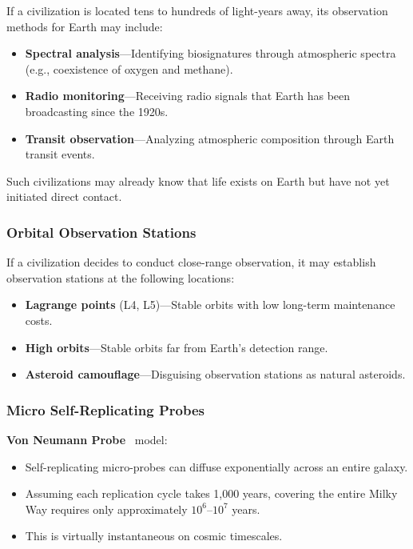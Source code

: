 \documentclass[aps,prd,twocolumn,superscriptaddress,nofootinbib]{revtex4-2}
\begin{document}
If a civilization is located tens to hundreds of light-years away, its observation methods for Earth may include:

\begin{itemize}
  \item \textbf{Spectral analysis}---Identifying biosignatures through atmospheric spectra (e.g., coexistence of oxygen and methane).
  \item \textbf{Radio monitoring}---Receiving radio signals that Earth has been broadcasting since the 1920s.
  \item \textbf{Transit observation}---Analyzing atmospheric composition through Earth transit events.
\end{itemize}

Such civilizations may already know that life exists on Earth but have not yet initiated direct contact.

\subsubsection{Orbital Observation Stations}\label{sec:orbital-stations}

If a civilization decides to conduct close-range observation, it may establish observation stations at the following locations:

\begin{itemize}
  \item \textbf{Lagrange points} (L4, L5)---Stable orbits with low long-term maintenance costs.
  \item \textbf{High orbits}---Stable orbits far from Earth's detection range.
  \item \textbf{Asteroid camouflage}---Disguising observation stations as natural asteroids.
\end{itemize}

\subsubsection{Micro Self-Replicating Probes}\label{sec:von-neumann}

\textbf{Von Neumann Probe}~\cite{Freitas1980} model:

\begin{itemize}
  \item Self-replicating micro-probes can diffuse exponentially across an entire galaxy.
  \item Assuming each replication cycle takes 1,000 years, covering the entire Milky Way requires only approximately $10^{6}$--$10^{7}$ years.
  \item This is virtually instantaneous on cosmic timescales.
\end{itemize}
\end{document}
